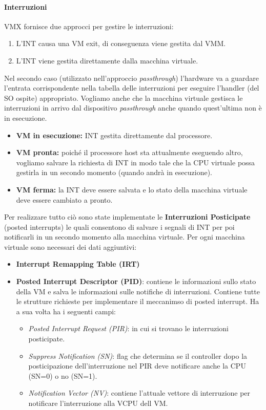 \documentclass{article}
\begin{document}
\paragraph{Interruzioni}
VMX fornisce due approcci per gestire le interruzioni:
\begin{enumerate}
    \item L’INT causa una VM exit, di conseguenza viene gestita dal VMM.
    \item L’INT viene gestita direttamente dalla macchina virtuale.
\end{enumerate}
Nel secondo caso (utilizzato nell’approccio \textit{passthrough}) l’hardware va a guardare l’entrata corrispondente nella tabella delle interruzioni per eseguire l’handler (del SO ospite) appropriato. Vogliamo anche che la macchina virtuale gestisca le interruzioni in arrivo dal dispositivo \textit{passthrough} anche quando quest’ultima non è in esecuzione.
\begin{itemize}
    \item \textbf{VM in esecuzione:} INT gestita direttamente dal processore.
    \item \textbf{VM pronta:} poiché il processore host sta attualmente eseguendo altro, vogliamo salvare la richiesta di INT in modo tale che la CPU virtuale possa gestirla in un secondo momento (quando andrà in esecuzione).
    \item \textbf{VM ferma:} la INT deve essere salvata e lo stato della macchina virtuale deve essere cambiato a pronto.
\end{itemize}
Per realizzare tutto ciò sono state implementate le \textbf{Interruzioni Posticipate} (posted interrupts) le quali consentono di salvare i segnali di INT per poi notificarli in un secondo momento alla macchina virtuale.
Per ogni macchina virtuale sono necessari dei dati aggiuntivi:
\begin{itemize}
    \item \textbf{Interrupt Remapping Table (IRT)}
    \item \textbf{Posted Interrupt Descriptor (PID)}: contiene le informazioni sullo stato della VM e salva le informazioni sulle notifiche di interruzioni. Contiene tutte le strutture richieste per implementare il meccanimso di posted interrupt. Ha a sua volta ha i seguenti campi:
    \begin{itemize}
        \item \textit{Posted Interrupt Request (PIR)}: in cui si trovano le interruzioni posticipate.
        \item \textit{Suppress Notification (SN)}: flag che determina se il controller dopo la posticipazione dell'interruzione nel PIR deve notificare anche la CPU (SN=0) o no (SN=1).
        \item \textit{Notification Vector (NV)}: contiene l'attuale vettore di interruzione per notificare l'interruzione alla VCPU dell VM.
    \end{itemize}
\end{itemize}
\end{document}
